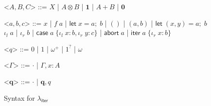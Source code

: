 \documentclass[acmsmall,screen,review]{acmart}
\newcommand{\mb}[1]{\ensuremath{\mathbf{#1}}}
\newcommand{\ms}[1]{\ensuremath{\mathsf{#1}}}
\newcommand{\lto}{:}
\newcommand{\linl}[1]{\iota_l\;{#1}}
\newcommand{\linr}[1]{\iota_r\;{#1}}
\newcommand{\labort}[1]{\ms{abort}\;{#1}}
\newcommand{\letexpr}[3]{\ensuremath{\ms{let}\;#1 = #2;\;#3}}
\newcommand{\caseexpr}[5]{\ms{case}\;#1\;\{\linl{#2} \lto #3, \linr{#4} \lto #5\}}
\newcommand{\liter}[3]{\ms{iter}\;#1\;\{ \linr{#2} \lto #3 \}}
\newcommand{\subiterssa}{\(\lambda_{\ms{iter}}\)}
\newcommand{\zeroq}{0}
\newcommand{\oneq}{1}
\newcommand{\delq}{1^?}
\newcommand{\cpyq}{\omega^+}
\newcommand{\topq}{\omega}
\begin{document}
\begin{figure}
  \begin{grammar}
    <\(A, B, C\)> ::= 
    \(X\)
    \;|\; \(A \otimes B\)
    \;|\; \(\mathbf{1}\)
    \;|\; \(A + B\)
    \;|\; \(\mathbf{0}\)

    <\(a, b, c\)> ::=
    \(x\)
    \;|\; \(f\;a\)
    \;|\; \(\letexpr{x}{a}{b}\)
    \;|\; \(()\)
    \;|\; \((a, b)\)
    \;|\; \(\letexpr{(x, y)}{a}{b}\)
    \alt  \(\linl{a}\)
    \;|\; \(\linr{b}\)
    \;|\; \(\caseexpr{a}{x}{b}{y}{c}\)
    \;|\; \(\labort{a}\)
    \;|\; \(\liter{a}{x}{b}\)
    
    <\(q\)> ::= \(\zeroq\) | \(\oneq\) | \(\cpyq\) | \(\delq\) | \(\topq\)

    <\(\Gamma\)> ::= \(\cdot\) \;|\; \(\Gamma, x : A\)

    <\(\mb{q}\)> ::= \(\cdot\) \;|\; \(\mb{q}, q\)
  \end{grammar}
  \caption{Syntax for \subiterssa}
  \label{fig:subiterssa-syntax}
\end{figure}
\end{document}
